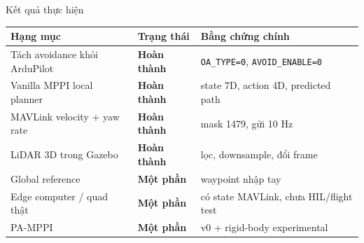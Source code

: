 \documentclass[aspectratio=169,11pt]{beamer}
\newcommand{\ok}{\textcolor{green!45!black}{\textbf{Hoàn thành}}}
\newcommand{\partdone}{\textcolor{orange!80!black}{\textbf{Một phần}}}
\begin{document}
\begin{frame}{Kết quả thực hiện}
  \renewcommand{\arraystretch}{1.22}
  \begin{tabular}{>{\RaggedRight\arraybackslash}p{}
                  >{\RaggedRight\arraybackslash}p{}
                  >{\RaggedRight\arraybackslash}p{}}
    \toprule
    Hạng mục & Trạng thái & Bằng chứng chính \\
    \midrule
    Tách avoidance khỏi ArduPilot & \ok & \texttt{OA\_TYPE=0}, \texttt{AVOID\_ENABLE=0} \\
    Vanilla MPPI local planner & \ok & state 7D, action 4D, predicted path \\
    MAVLink velocity + yaw rate & \ok & mask 1479, gửi 10 Hz \\
    LiDAR 3D trong Gazebo & \ok & lọc, downsample, đổi frame \\
    Global reference & \partdone & waypoint nhập tay \\
    Edge computer / quad thật & \partdone & có state MAVLink, chưa HIL/flight test \\
    PA-MPPI & \partdone & v0 + rigid-body experimental \\
    \bottomrule
  \end{tabular}
\end{frame}
\end{document}
